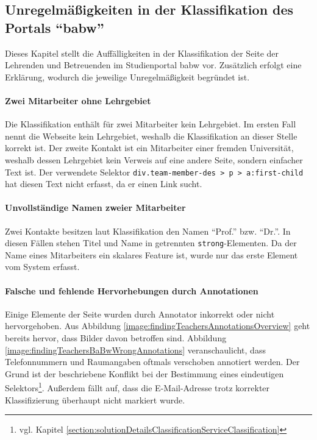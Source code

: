\subsection{Unregelmäßigkeiten in der Klassifikation des Portals "`\gls{babw}"'}
    \label{section:findingsTeachersAbnormalitiesBabw}
    Dieses Kapitel stellt die Auffälligkeiten in der Klassifikation
    der Seite der Lehrenden und Betreuenden im Studienportal
    \gls{babw} vor.
    Zusätzlich erfolgt eine Erklärung,
    wodurch die jeweilige Unregelmäßigkeit begründet ist.

    \paragraph{Zwei Mitarbeiter ohne Lehrgebiet}
    Die Klassifikation enthält für zwei Mitarbeiter kein Lehrgebiet.
    Im ersten Fall nennt die Webseite kein Lehrgebiet,
    weshalb die Klassifikation an dieser Stelle korrekt ist.
    Der zweite Kontakt ist ein Mitarbeiter einer fremden Universität,
    weshalb dessen Lehrgebiet kein Verweis auf eine andere Seite,
    sondern einfacher Text ist.
    Der verwendete Selektor \texttt{div.team-member-des > p > a:first-child}
    hat diesen Text nicht erfasst, da er einen Link sucht.

    \paragraph{Unvollständige Namen zweier Mitarbeiter}
    Zwei Kontakte besitzen laut Klassifikation den Namen "`Prof."' bzw. "`Dr."'.
    In diesen Fällen stehen Titel und Name in getrennten \texttt{strong}-Elementen.
    Da der Name eines Mitarbeiters ein skalares Feature ist,
    wurde nur das erste Element vom System erfasst.

    \paragraph{Falsche und fehlende Hervorhebungen durch Annotationen}
    Einige Elemente der Seite wurden durch Annotator inkorrekt oder nicht hervorgehoben.
    Aus Abbildung \ref{image:findingTeachersAnnotationsOverview} geht bereits hervor,
    dass Bilder davon betroffen sind.
    Abbildung \ref{image:findingTeachersBaBwWrongAnnotations}
    veranschaulicht, dass Telefonnummern und Raumangaben oftmals verschoben annotiert werden.
    Der Grund ist der
    beschriebene Konflikt bei der Bestimmung eines eindeutigen
    Selektors\footnote{vgl. Kapitel \ref{section:solutionDetailsClassificationServiceClassification}}.
    Außerdem fällt auf, dass die E-Mail-Adresse trotz korrekter Klassifizierung
    überhaupt nicht markiert wurde.

